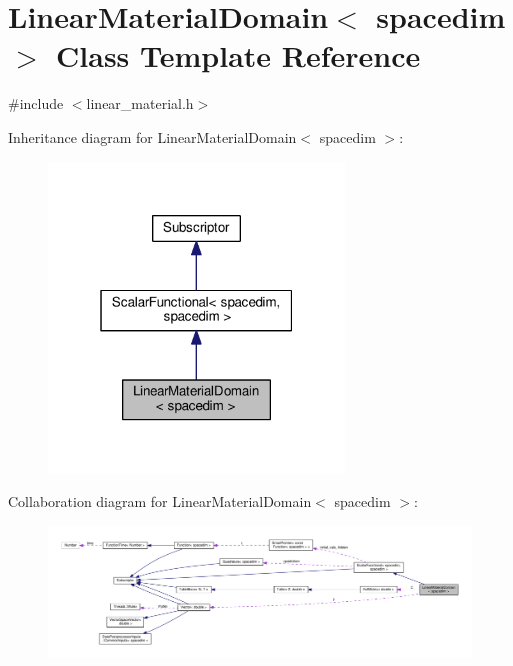 \hypertarget{class_linear_material_domain}{}\section{Linear\+Material\+Domain$<$ spacedim $>$ Class Template Reference}
\label{class_linear_material_domain}


{\ttfamily \#include $<$linear\+\_\+material.\+h$>$}



Inheritance diagram for Linear\+Material\+Domain$<$ spacedim $>$\+:\nopagebreak
\begin{figure}[H]
\begin{center}
\leavevmode
\includegraphics[width=223pt]{class_linear_material_domain__inherit__graph}
\end{center}
\end{figure}


Collaboration diagram for Linear\+Material\+Domain$<$ spacedim $>$\+:\nopagebreak
\begin{figure}[H]
\begin{center}
\leavevmode
\includegraphics[width=350pt]{class_linear_material_domain__coll__graph}
\end{center}
\end{figure}
